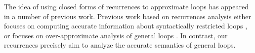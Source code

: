
The idea of using closed forms of recurrences to approximate loops has appeared in a number of previous work. 
Previous work based on recurrences analysis either focuses on computing accurate information about syntactically restricted loops \cite{rodriguez2004automatic,kovacs2004, humenberger2017automated}, or focuses on over-approximate analysis of general loops \cite{farzan2015compositional,kincaid2017compositional,kincaid2017non}. 
In contrast, our recurrences precisely
aim to analyze the accurate semantics of general loops.



